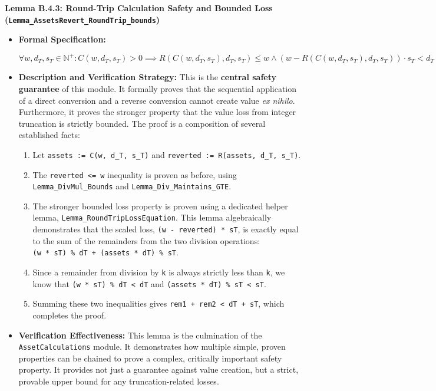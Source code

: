 \documentclass[
  english,
  onecolumn]{article}
\providecommand{\tightlist}{%
  \setlength{\itemsep}{0pt}\setlength{\parskip}{0pt}}
\begin{document}
\textbf{Lemma B.4.3: Round-Trip Calculation Safety and Bounded Loss
(\texttt{Lemma\_AssetsRevert\_RoundTrip\_bounds})}

\begin{itemize}
\item
  \textbf{Formal Specification:}

  \(\forall w, d_T, s_T \in \mathbb{N}^+ : C(w, d_T, s_T) > 0 \implies R(C(w, d_T, s_T), d_T, s_T) \le w \land (w - R(C(w, d_T, s_T), d_T, s_T)) \cdot s_T < d_T + s_T\)
\item
  \textbf{Description and Verification Strategy:} This is the
  \textbf{central safety guarantee} of this module. It formally proves
  that the sequential application of a direct conversion and a reverse
  conversion cannot create value \emph{ex nihilo}. Furthermore, it
  proves the stronger property that the value loss from integer
  truncation is strictly bounded. The proof is a composition of several
  established facts:

  \begin{enumerate}
  \def\labelenumi{\arabic{enumi}.}
  \tightlist
  \item
    Let \texttt{assets\ :=\ C(w,\ d\_T,\ s\_T)} and
    \texttt{reverted\ :=\ R(assets,\ d\_T,\ s\_T)}.
  \item
    The \texttt{reverted\ \textless{}=\ w} inequality is proven as
    before, using \texttt{Lemma\_DivMul\_Bounds} and
    \texttt{Lemma\_Div\_Maintains\_GTE}.
  \item
    The stronger bounded loss property is proven using a dedicated
    helper lemma, \texttt{Lemma\_RoundTripLossEquation}. This lemma
    algebraically demonstrates that the scaled loss,
    \texttt{(w\ -\ reverted)\ *\ sT}, is exactly equal to the sum of the
    remainders from the two division operations:
    \texttt{(w\ *\ sT)\ \%\ dT\ +\ (assets\ *\ dT)\ \%\ sT}.
  \item
    Since a remainder from division by \texttt{k} is always strictly
    less than \texttt{k}, we know that
    \texttt{(w\ *\ sT)\ \%\ dT\ \textless{}\ dT} and
    \texttt{(assets\ *\ dT)\ \%\ sT\ \textless{}\ sT}.
  \item
    Summing these two inequalities gives
    \texttt{rem1\ +\ rem2\ \textless{}\ dT\ +\ sT}, which completes the
    proof.
  \end{enumerate}
\item
  \textbf{Verification Effectiveness:} This lemma is the culmination of
  the \texttt{AssetCalculations} module. It demonstrates how multiple
  simple, proven properties can be chained to prove a complex,
  critically important safety property. It provides not just a guarantee
  against value creation, but a strict, provable upper bound for any
  truncation-related losses.
\end{itemize}
\end{document}
